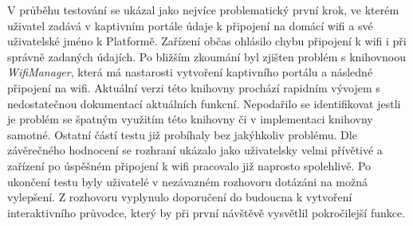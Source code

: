 V průběhu testování se ukázal jako nejvíce problematický první krok, ve kterém uživatel zadává v kaptivním portále údaje k připojení na domácí wifi a své uživatelské jméno k Platformě. Zařízení občas ohlásilo chybu připojení k wifi i při správně zadaných údajích. Po bližším zkoumání byl zjišten problém s knihovnoou \textit{WifiManager}, která má nastarosti vytvoření kaptivního portálu a následné připojení na wifi. Aktuální verzi této knihovny prochází rapidním vývojem s nedostatečnou dokumentací aktuálních funkcní. Nepodařilo se identifikovat jestli je problém se špatným využitím této knihovny či v implementaci knihovny samotné. Ostatní částí testu již probíhaly bez jakýhkoliv problému. Dle závěrečného hodnocení se rozhraní ukázalo jako uživatelsky velmi přívětivé a zařízení po úspěšném připojení k wifi pracovalo již naprosto spolehlivě. Po ukončení testu byly uživatelé v nezávazném rozhovoru dotázáni na možná vylepšení. Z rozhovoru vyplynulo doporučení do budoucna k vytvoření interaktivního průvodce, který by při první návštěvě vysvětlil pokročilejší funkce.